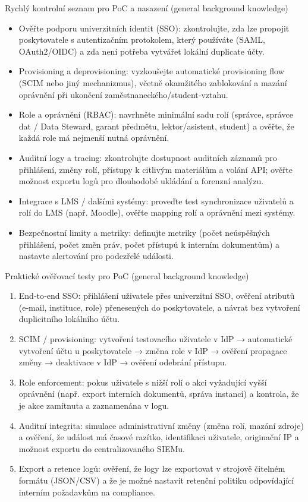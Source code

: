 \documentclass{report}%
\begin{document}
Rychlý kontrolní seznam pro PoC a nasazení (general background knowledge)
\begin{itemize}
  \item Ověřte podporu univerzitních identit (SSO): zkontrolujte, zda lze propojit poskytovatele s autentizačním protokolem, který používáte (SAML, OAuth2/OIDC) a zda není potřeba vytvářet lokální duplicate účty.
  \item Provisioning a deprovisioning: vyzkoušejte automatické provisioning flow (SCIM nebo jiný mechanizmus), včetně okamžitého zablokování a mazání oprávnění při ukončení zaměstnaneckého/student‑vztahu.
  \item Role a oprávnění (RBAC): navrhněte minimální sadu rolí (správce, správce dat / Data Steward, garant předmětu, lektor/asistent, student) a ověřte, že každá role má nejmenší nutná oprávnění.
  \item Auditní logy a tracing: zkontrolujte dostupnost auditních záznamů pro přihlášení, změny rolí, přístupy k citlivým materiálům a volání API; ověřte možnost exportu logů pro dlouhodobé ukládání a forenzní analýzu.
  \item Integrace s LMS / dalšími systémy: proveďte test synchronizace uživatelů a rolí do LMS (např. Moodle), ověřte mapping rolí a oprávnění mezi systémy.
  \item Bezpečnostní limity a metriky: definujte metriky (počet neúspěšných přihlášení, počet změn práv, počet přístupů k interním dokumentům) a nastavte alertování pro podezřelé události.
\end{itemize}

Praktické ověřovací testy pro PoC (general background knowledge)
\begin{enumerate}
  \item End‑to‑end SSO: přihlášení uživatele přes univerzitní SSO, ověření atributů (e‑mail, instituce, role) přenesených do poskytovatele, a návrat bez vytvoření duplicitního lokálního účtu.
  \item SCIM / provisioning: vytvoření testovacího uživatele v IdP → automatické vytvoření účtu u poskytovatele → změna role v IdP → ověření propagace změny → deaktivace v IdP → ověření odebrání přístupu.
  \item Role enforcement: pokus uživatele s nižší rolí o akci vyžadující vyšší oprávnění (např. export interních dokumentů, správa instancí) a kontrola, že je akce zamítnuta a zaznamenána v logu.
  \item Auditní integrita: simulace administrativní změny (změna rolí, mazání zdroje) a ověření, že událost má časové razítko, identifikaci uživatele, originační IP a možnost exportu do centralizovaného SIEMu.
  \item Export a retence logů: ověření, že logy lze exportovat v strojově čitelném formátu (JSON/CSV) a že je možné nastavit retenční politiku odpovídající interním požadavkům na compliance.
\end{enumerate}
\end{document}
